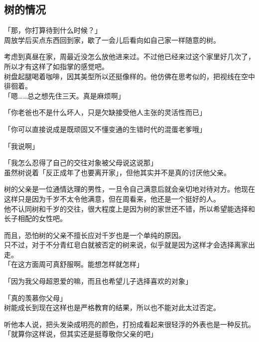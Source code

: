 \subsection{树的情况}

「那，你打算待到什么时候？」\\

周放学后买点东西回到家，歇了一会儿后看向如自己家一样随意的树。

考虑到真昼在家，周最近没怎么放他进来过。不过他已经来过这个家里好几次了，所以才有这样了如指掌的感觉吧。\\

树盘起腿喝着咖啡，因其美型所以还挺像样的。他仿佛在思考似的，把视线在空中徘徊着。\\

「嗯……总之想先住三天。真是麻烦啊」

「你老爸也不是什么坏人，只是欠缺接受他人主张的灵活性而已」

「你可以直接说成是既顽固又不懂变通的生错时代的混蛋老爹哦」

「我说啊」

「我怎么忍得了自己的交往对象被父母说这说那」\\

虽然树说着「反正成年了也要离开家」，但他其实并不是真的讨厌他父亲。

树的父亲是一位通情达理的男性，一旦令自己满意后就会亲切地对待对方。他现在这样只是因为千岁不太令他满意，但在周看来，他还是一个挺好的人。\\

他不认同树和千岁的交往，很大程度上是因为树的家世还不错，所以希望能选择和长子相配的女性吧。

而且，恐怕树的父亲不擅长应对千岁也是一个单纯的原因。\\

只不过，对于不分青红皂白就被否定的树来说，似乎就是因为这样才会选择离家出走。\\

「在这方面周可真舒服啊。能想怎样就怎样」

「因为我父母超恩爱的嘛，而且也希望儿子选择喜欢的对象」

「真的羡慕你父母」\\

树能成长到现在这样也是严格教育的结果，所以也不能对此太过否定。

听他本人说，把头发染成明亮的颜色，打扮成看起来很轻浮的外表也是一种反抗。\\

「就算你这样说，但其实还是挺尊敬你父亲的吧」

